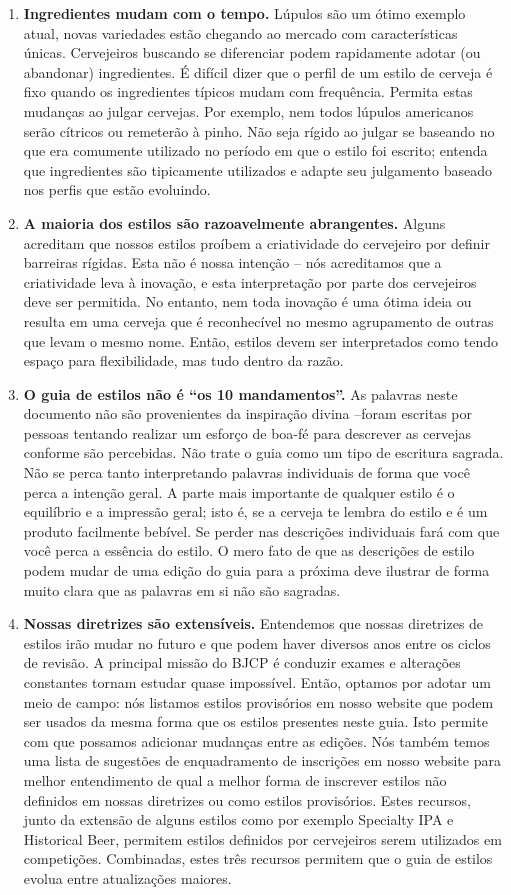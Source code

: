 \begin{enumerate}
\item \textbf{Ingredientes mudam com o tempo.} Lúpulos são um ótimo exemplo atual, novas variedades estão chegando ao mercado com características únicas. Cervejeiros buscando se diferenciar podem rapidamente adotar (ou abandonar) ingredientes. É difícil dizer que o perfil de um estilo de cerveja é fixo quando os ingredientes típicos mudam com frequência. Permita estas mudanças ao julgar cervejas. Por exemplo, nem todos lúpulos americanos serão cítricos ou remeterão à pinho. Não seja rígido ao julgar se baseando no que era comumente utilizado no período em que o estilo foi escrito; entenda que ingredientes são tipicamente utilizados e adapte seu julgamento baseado nos perfis que estão evoluindo.
\item \textbf{A maioria dos estilos são razoavelmente abrangentes.} Alguns acreditam que nossos estilos proíbem a criatividade do cervejeiro por definir barreiras rígidas. Esta não é nossa intenção – nós acreditamos que a criatividade leva à inovação, e esta interpretação por parte dos cervejeiros deve ser permitida. No entanto, nem toda inovação é uma ótima ideia ou resulta em uma cerveja que é reconhecível no mesmo agrupamento de outras que levam o mesmo nome. Então, estilos devem ser interpretados como tendo espaço para flexibilidade, mas tudo dentro da razão.
\item \textbf{O guia de estilos não é “os 10 mandamentos”.} As palavras neste documento não são provenientes da inspiração divina –foram escritas por pessoas tentando realizar um esforço de boa-fé para descrever as cervejas conforme são percebidas. Não trate o guia como um tipo de escritura sagrada. Não se perca tanto interpretando palavras individuais de forma que você perca a intenção geral. A parte mais importante de qualquer estilo é o equilíbrio e a impressão geral; isto é, se a cerveja te lembra do estilo e é um produto facilmente bebível. Se perder nas descrições individuais fará com que você perca a essência do estilo. O mero fato de que as descrições de estilo podem mudar de uma edição do guia para a próxima deve ilustrar de forma muito clara que as palavras em si não são sagradas.
\item \textbf{Nossas diretrizes são extensíveis.} Entendemos que nossas diretrizes de estilos irão mudar no futuro e que podem haver diversos anos entre os ciclos de revisão. A principal missão do BJCP é conduzir exames e alterações constantes tornam estudar quase impossível. Então, optamos por adotar um meio de campo: nós listamos estilos provisórios em nosso website que podem ser usados da mesma forma que os estilos presentes neste guia. Isto permite com que possamos adicionar mudanças entre as edições. Nós também temos uma lista de sugestões de enquadramento de inscrições em nosso website para melhor entendimento de qual a melhor forma de inscrever estilos não definidos em nossas diretrizes ou como estilos provisórios. Estes recursos, junto da extensão de alguns estilos como por exemplo Specialty IPA e Historical Beer, permitem estilos definidos por cervejeiros serem utilizados em competições.  Combinadas, estes três recursos permitem que o guia de estilos evolua entre atualizações maiores.

\end{enumerate}
